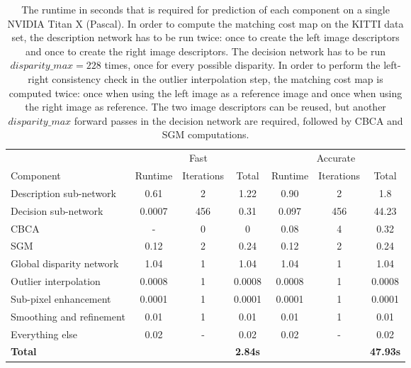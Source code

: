 \documentclass[10pt, twocolumn, letterpaper]{article}
\begin{document}
\begin{table*}[t]
\centering

\begin{tabular}{lccc|ccc}
                         & \multicolumn{3}{c}{Fast}     	& \multicolumn{3}{c}{Accurate} \\ \cline{2-4} \cline{5-7} 
Component                & Runtime & Iterations & Total 	& Runtime & Iterations  & Total \\ \hline
Description sub-network  & 0.61    & 2          & 1.22  	& 0.90    & 2           & 1.8      \\
Decision sub-network     & 0.0007  & 456        & 0.31  	& 0.097  & 456         & 44.23      \\
CBCA                     &  -      & 0          & 0     	& 0.08   & 4           & 0.32       \\
SGM                      &  0.12   & 2          & 0.24      & 0.12   & 2			& 0.24      \\
Global disparity network &  1.04   & 1          & 1.04      & 1.04   & 1          & 1.04      \\
Outlier interpolation    &  0.0008 & 1          & 0.0008    & 0.0008 & 1          & 0.0008      \\
Sub-pixel enhancement    &  0.0001 & 1          & 0.0001    & 0.0001 & 1          & 0.0001      \\
Smoothing and refinement &  0.01   & 1          & 0.01      & 0.01   & 1         & 0.01      \\ \hdashline
Everything else          &  0.02   & -          & 0.02      & 0.02   & -          & 0.02      \\ \hline
\bf{Total}               &         &         & \bf{2.84s}   &         &             & \bf{47.93s}     
\end{tabular}
\caption{The runtime in seconds that is required for prediction of each component on a single NVIDIA Titan X (Pascal). In order to compute the matching cost map on the KITTI data set, the description network has to be run twice: once to create the left image descriptors and once to create the right image descriptors. The decision network has to be run $disparity\_max=228$ times, once for every possible disparity. In order to perform the left-right consistency check in the outlier interpolation step, the matching cost map is computed twice: once when using the left image as a reference image and once when using the right image as reference. The two image descriptors can be reused, but another $disparity\_max$ forward passes in the decision network are required, followed by CBCA and SGM computations.}
\label{tab:runtime}
\end{table*}
\end{document}
